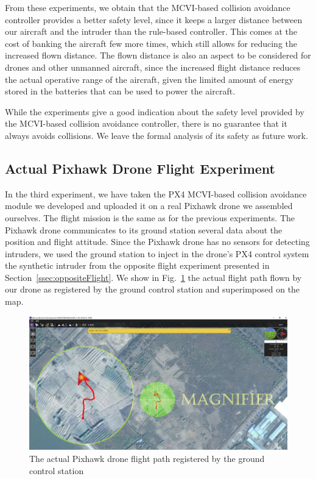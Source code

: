 \documentclass[orivec]{llncs}
\begin{document}
From these experiments, we obtain that the MCVI-based collision avoidance controller provides a better safety level, since it keeps a larger distance between our aircraft and the intruder than the rule-based controller.
This comes at the cost of banking the aircraft few more times, which still allows for reducing the increased flown distance.
The flown distance is also an aspect to be considered for drones and other unmanned aircraft, since the increased flight distance reduces the actual operative range of the aircraft, given the limited amount of energy stored in the batteries that can be used to power the aircraft.

While the experiments give a good indication about the safety level provided by the MCVI-based collision avoidance controller, there is no guarantee that it always avoids collisions.
We leave the formal analysis of its safety as future work.


\subsection{Actual Pixhawk Drone Flight Experiment}
\label{ssec:realDrone}

In the third experiment, we have taken the PX4 MCVI-based collision avoidance module we developed and uploaded it on a real Pixhawk drone we assembled ourselves. %
The flight mission is the same as for the previous experiments. 
The Pixhawk drone communicates to its ground station several data about the position and flight attitude.
Since the Pixhawk drone has no sensors for detecting intruders, we used the ground station to inject in the drone's PX4 control system the synthetic intruder from the opposite flight experiment presented in Section~\ref{ssec:oppositeFlight}.
We show in Fig.~\ref{fig:realFlightPath} the actual flight path flown by our drone as registered by the ground control station and superimposed on the map.

\begin{figure}[t]
	\centering 
	\includegraphics[width=1\linewidth]{realFlightPath.jpg}
	\caption{The actual Pixhawk drone flight path registered by the ground control station}
	\label{fig:realFlightPath}
\end{figure}
\end{document}
